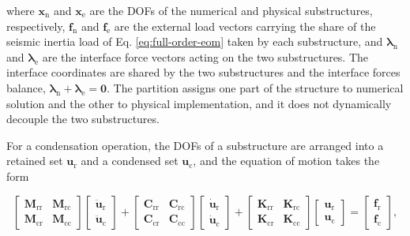\documentclass[a4paper,fleqn,review,12pt]{cas-sc}
\numberwithin{equation}{section}
\begin{document}
\noindent where \(\bm{x}_{\mathrm{n}}\) and \(\bm{x}_{\mathrm{e}}\) are the DOFs of the numerical and physical substructures, respectively, \(\bm{f}_{\mathrm{n}}\) and \(\bm{f}_{\mathrm{e}}\) are the external load vectors carrying the share of the seismic inertia load of Eq. \eqref{eq:full-order-eom} taken by each substructure, and \(\bm{\lambda}_{\mathrm{n}}\) and \(\bm{\lambda}_{\mathrm{e}}\) are the interface force vectors acting on the two substructures. The interface coordinates are shared by the two substructures and the interface forces balance, \(\bm{\lambda}_{\mathrm{n}}+\bm{\lambda}_{\mathrm{e}}=\bm{0}\). The partition assigns one part of the structure to numerical solution and the other to physical implementation, and it does not dynamically decouple the two substructures.

For a condensation operation, the DOFs of a substructure are arranged into a retained set \(\bm{u}_{\mathrm{r}}\) and a condensed set \(\bm{u}_{\mathrm{c}}\), and the equation of motion takes the form

\vspace{-3.5em}
\begin{equation}
	\begin{bmatrix}
		\mathbf{M}_{\mathrm{rr}} & \mathbf{M}_{\mathrm{rc}}\\
		\mathbf{M}_{\mathrm{cr}} & \mathbf{M}_{\mathrm{cc}}
	\end{bmatrix}
	\begin{bmatrix}
		\ddot{\bm{u}}_{\mathrm{r}}\\
		\ddot{\bm{u}}_{\mathrm{c}}
	\end{bmatrix}
	+
	\begin{bmatrix}
		\mathbf{C}_{\mathrm{rr}} & \mathbf{C}_{\mathrm{rc}}\\
		\mathbf{C}_{\mathrm{cr}} & \mathbf{C}_{\mathrm{cc}}
	\end{bmatrix}
	\begin{bmatrix}
		\dot{\bm{u}}_{\mathrm{r}}\\
		\dot{\bm{u}}_{\mathrm{c}}
	\end{bmatrix}
	+
	\begin{bmatrix}
		\mathbf{K}_{\mathrm{rr}} & \mathbf{K}_{\mathrm{rc}}\\
		\mathbf{K}_{\mathrm{cr}} & \mathbf{K}_{\mathrm{cc}}
	\end{bmatrix}
	\begin{bmatrix}
		\bm{u}_{\mathrm{r}}\\
		\bm{u}_{\mathrm{c}}
	\end{bmatrix}
	=
	\begin{bmatrix}
		\bm{f}_{\mathrm{r}}\\
		\bm{f}_{\mathrm{c}}
	\end{bmatrix},
	\label{eq:partitioned-local-eom}
\end{equation}
\vspace{-3.5em}
\end{document}

